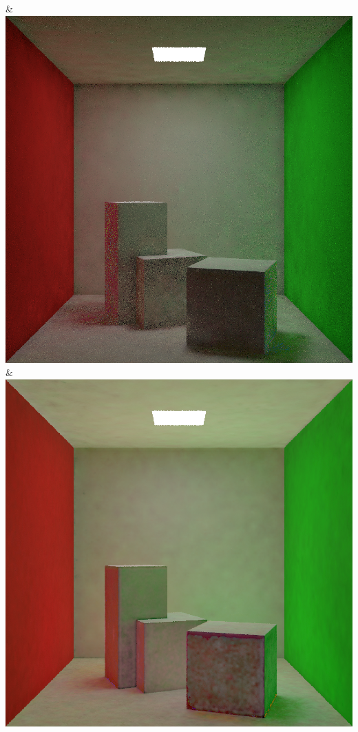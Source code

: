 & \includegraphics[width=\linewidth]{figures/py/tests/quality_comparison/nrc+bt_1spp_diffuse.png}
& \includegraphics[width=\linewidth]{figures/py/tests/quality_comparison/nrc+lt_1spp_diffuse.png}
